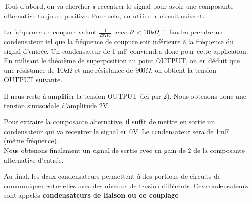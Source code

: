 Tout d'abord, on va chercher à recentrer le signal pour avoir une composante alternative toujours positive.
Pour cela, on utilise le circuit suivant.


La fréquence de coupure valant $\frac{1}{2\pi RC}$ avec $ R < 10 k\Omega$, il faudra prendre un condensateur tel que la fréquence de coupure soit inférieure à la fréquence du signal d'entrée. \n
Un condensateur de 1 mF conviendra donc pour cette application.\\

En utilisant le théorème de superposition au point OUTPUT, on en déduit que une résistance de $10 k\Omega$ et une résistance de $ 900 \Omega$, on obtient la tension OUTPUT suivante.


Il nous reste à amplifier la tension OUTPUT (ici par 2). Nous obtenons donc une tension sinusoïdale d'amplitude 2V. \\


Pour extraire la composante alternative, il suffit de mettre en sortie un condensateur qui va recentrer le signal en 0V.
Le condensateur sera de 1mF (même fréquence). \\
Nous obtenons finalement un signal de sortie avec un gain de 2 de la composante alternative d'entrée.\n

Au final, les deux condensateurs permettent à des portions de circuits de communiquer entre elles avec des niveaux de tension différents. Ces condensateurs sont appelés \textbf{condensateurs de liaison ou de couplage}






